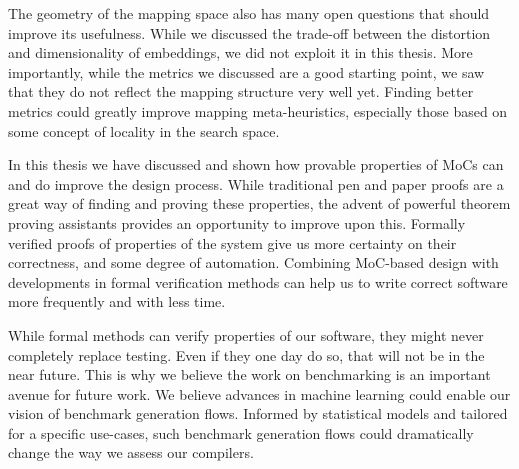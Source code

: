 The geometry of the mapping space also has many open questions that should improve its usefulness.
While we discussed the trade-off between the distortion and dimensionality of embeddings, we did not exploit it in this thesis.
More importantly, while the metrics we discussed are a good starting point, we saw that they do not reflect the mapping structure very well yet.
Finding better metrics could greatly improve mapping meta-heuristics, especially those based on some concept of locality in the search space.

In this thesis we have discussed and shown how provable properties of \acp{MoC} can and do improve the design process.
While traditional pen and paper proofs are a great way of finding and proving these properties, the advent of powerful theorem proving assistants provides an opportunity to improve upon this.
Formally verified proofs of properties of the system give us more certainty on their correctness, and some degree of automation.
Combining \ac{MoC}-based design with developments in formal verification methods can help us to write correct software more frequently and with less time.

While formal methods can verify properties of our software, they might never completely replace testing.
Even if they one day do so, that will not be in the near future.
This is why we believe the work on benchmarking is an important avenue for future work.
We believe advances in machine learning could enable our vision of benchmark generation flows.
Informed by statistical models and tailored for a specific use-cases, such benchmark generation flows could dramatically change the way we assess our compilers.

